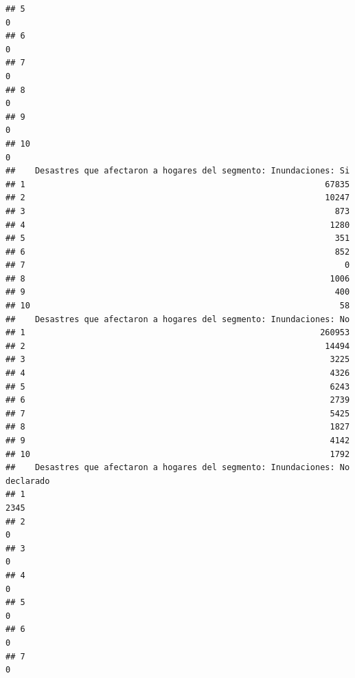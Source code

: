 \documentclass[11pt,]{article}
\begin{document}
\begin{verbatim}
## 5                                                                       0
## 6                                                                       0
## 7                                                                       0
## 8                                                                       0
## 9                                                                       0
## 10                                                                      0
##    Desastres que afectaron a hogares del segmento: Inundaciones: Si
## 1                                                             67835
## 2                                                             10247
## 3                                                               873
## 4                                                              1280
## 5                                                               351
## 6                                                               852
## 7                                                                 0
## 8                                                              1006
## 9                                                               400
## 10                                                               58
##    Desastres que afectaron a hogares del segmento: Inundaciones: No
## 1                                                            260953
## 2                                                             14494
## 3                                                              3225
## 4                                                              4326
## 5                                                              6243
## 6                                                              2739
## 7                                                              5425
## 8                                                              1827
## 9                                                              4142
## 10                                                             1792
##    Desastres que afectaron a hogares del segmento: Inundaciones: No declarado
## 1                                                                        2345
## 2                                                                           0
## 3                                                                           0
## 4                                                                           0
## 5                                                                           0
## 6                                                                           0
## 7                                                                           0

\end{verbatim}
\end{document}
